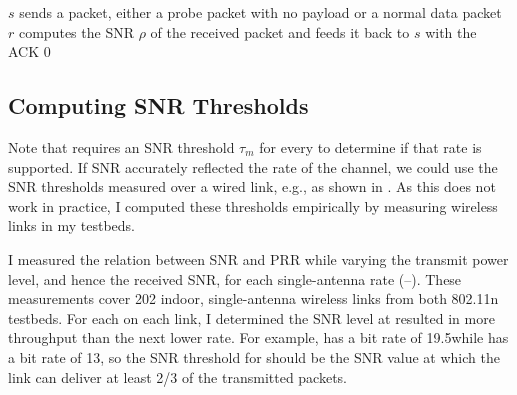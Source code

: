 \begin{algorithm}[t]
\caption{\label{alg:get_bitrate_threshold}}
\begin{algorithmic}
\IF{$\rho > \tau$}
 \hfill {}
\ELSE
{} \hfill {}
\ENDIF
\end{algorithmic}
\end{algorithm}

\begin{algorithm}[t]
\caption{\label{alg:predict_rate_snr}}
\begin{algorithmic}
\STATE $s$ sends a packet, either a probe packet with no payload or a normal data packet
\STATE $r$ computes the SNR $\rho$ of the received packet and feeds it back to $s$ with the ACK
\RETURN {}
\ELSE
\RETURN $0$ \hfill {}
\ENDIF
\end{algorithmic}
\end{algorithm}

\subsection{Computing SNR Thresholds}
Note that  requires an SNR threshold $\tau_m$ for every  to determine if that rate is supported. If SNR accurately reflected the rate of the channel, we could use the SNR thresholds measured over a wired link, e.g., as shown in . As this does not work in practice, I computed these thresholds empirically by measuring wireless links in my testbeds.

I measured the relation between SNR and PRR while varying the transmit power level, and hence the received SNR, for each single-antenna rate (--). These measurements cover 202 indoor, single-antenna wireless links from both 802.11n testbeds.
For each  on each link, I determined the SNR level at  resulted in more throughput than the next lower rate. For example,  has a bit rate of 19.5\Mbps while  has a bit rate of 13\Mbps, so the SNR threshold for  should be the SNR value at which the link can deliver at least 2/3 of the transmitted packets.

